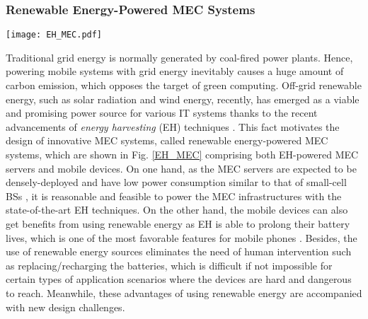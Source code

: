 \documentclass[journal]{IEEEtran}
\begin{document}
{\subsubsection{\textbf{Renewable Energy-Powered MEC Systems}}
\begin{figure*}[!t]
\begin{center}
   \texttt{[image: EH\_MEC.pdf]}
\end{center}
\caption{Renewable energy-powered MEC systems.}
\label{EH_MEC}
\end{figure*}
Traditional grid energy is normally generated by coal-fired power plants. Hence, powering mobile systems with grid energy inevitably causes a huge amount of carbon emission, which opposes the target of green computing. Off-grid renewable energy, such as solar radiation and wind energy, recently, has emerged as a viable and promising power source for various IT systems thanks to the recent advancements of \emph{energy harvesting} (EH) techniques \cite{SudevalayamSandT11,SUlukusJSAC1503}. This fact motivates the design of innovative MEC systems, called renewable energy-powered MEC systems, which are shown in Fig. \ref{EH_MEC} comprising both EH-powered MEC servers and mobile devices.
On one hand, as the MEC servers are expected to be densely-deployed and have low power consumption similar to that of small-cell BSs \cite{YMaoComMag1506}, it is reasonable and feasible to power the MEC infrastructures with the state-of-the-art EH techniques. On the other hand, the mobile devices can also get benefits from using renewable energy as EH is able to prolong their battery lives, which is one of the most favorable features for mobile phones \cite{CNNbattery05}. Besides, the use of renewable energy sources eliminates the need of human intervention such as replacing/recharging the batteries, which is difficult if not impossible for certain types of application scenarios where the devices are hard and dangerous to reach. Meanwhile, these advantages of using renewable energy are accompanied with new design challenges.

}
\end{document}
